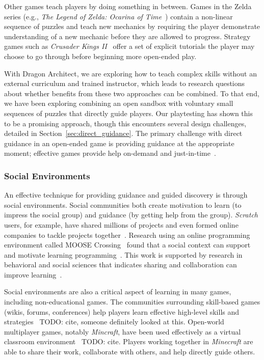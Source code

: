 \documentclass{sig-alternate}
\newcommand{\TODO}[1]{{\color{red} TODO: #1}}
\newcommand{\gametitle}{{Dragon Architect}}
\begin{document}
Other games teach players by doing something in between. 
Games in the Zelda series (e.g., \emph{The Legend of Zelda: Ocarina of Time}~\cite{zelda_oot}) contain a non-linear sequence of puzzles and teach new mechanics by requiring the player demonstrate understanding of a new mechanic before they are allowed to progress. 
Strategy games such as \emph{Crusader Kings II}~\cite{ck2} offer a set of explicit tutorials the player may choose to go through before beginning more open-ended play.

With \gametitle{}, we are exploring how to teach complex skills without an external curriculum and trained instructor, which leads to research questions about whether benefits from these two approaches can be combined.
To that end, we have been exploring combining an open sandbox with voluntary small sequences of puzzles that directly guide players.
Our playtesting has shown this to be a promising approach, though this encounters several design challenges, detailed in Section~\ref{sec:direct_guidance}.
The primary challenge with direct guidance in an open-ended game is providing guidance at the appropriate moment;
effective games provide help on-demand and just-in-time~\cite{gee2003video}.

\subsubsection{Social Environments}
\label{sec:social}

An effective technique for providing guidance and guided discovery is through social environments.
Social communities both create motivation to learn (to impress the social group) and guidance (by getting help from the group).
\emph{Scratch} users, for example, have shared millions of projects and even formed online companies to tackle projects together~\cite{resnick2009scratch}. 
Research using an online programming environment called MOOSE Crossing~\cite{bruckman1997moose} found that a social context can support and motivate learning programming~\cite{bruckman2000situated}.
This work is supported by research in behavioral and social sciences that indicates sharing and collaboration can improve learning~\cite{bransford2000people}. 

Social environments are also a critical aspect of learning in many games, including non-educational games.
The communities surrounding skill-based games (wikis, forums, conferences) help players learn effective high-level skills and strategies~\TODO{cite, someone definitely looked at this}.
Open-world multiplayer games, notably \emph{Mincraft}, have been used effectively as a virtual classroom environment~\TODO{cite}.
Players working together in \emph{Minecraft} are able to share their work, collaborate with others, and help directly guide others.
\end{document}
